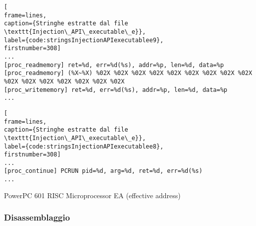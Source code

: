 \documentclass[10pt,a4paper, titlepage]{report}
\begin{document}
\begin{lstlisting}[
frame=lines, 
caption={Stringhe estratte dal file \texttt{Injection\_API\_executable\_e}}, 
label={code:stringsInjectionAPIexecutablee9},
firstnumber=308]
...
[proc_readmemory] ret=%d, err=%d(%s), addr=%p, len=%d, data=%p
[proc_readmemory] (%X~%X) %02X %02X %02X %02X %02X %02X %02X %02X %02X %02X %02X %02X %02X %02X %02X %02X
[proc_writememory] ret=%d, err=%d(%s), addr=%p, len=%d, data=%p
...
\end{lstlisting}

\begin{lstlisting}[
frame=lines, 
caption={Stringhe estratte dal file \texttt{Injection\_API\_executable\_e}}, 
label={code:stringsInjectionAPIexecutablee8},
firstnumber=308]
...
[proc_continue] PCRUN pid=%d, arg=%d, ret=%d, err=%d(%s)
...
\end{lstlisting}

PowerPC 601 RISC Microprocessor 
EA (effective address)
	
	\newpage
\subsubsection{Disassemblaggio}
	
\end{document}
